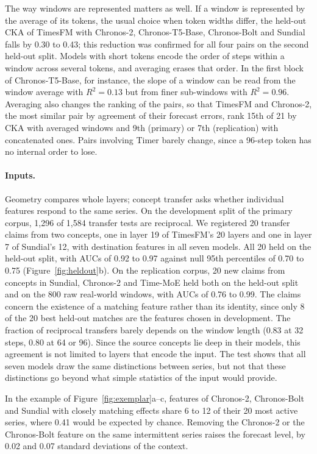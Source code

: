 \documentclass[twoside,11pt]{article}
\begin{document}
The way windows are represented matters as well. If a window is represented by the average of its tokens, the usual choice when token widths differ, the held-out CKA of TimesFM with Chronos-2, Chronos-T5-Base, Chronos-Bolt and Sundial falls by 0.30 to 0.43; this reduction was confirmed for all four pairs on the second held-out split.
Models with short tokens encode the order of steps within a window across several tokens, and averaging erases that order.
In the first block of Chronos-T5-Base, for instance, the slope of a window can be read from the window average with $R^2=0.13$ but from finer sub-windows with $R^2=0.96$.
Averaging also changes the ranking of the pairs, so that TimesFM and Chronos-2, the most similar pair by agreement of their forecast errors, rank 15th of 21 by CKA with averaged windows and 9th (primary) or 7th (replication) with concatenated ones.
Pairs involving Timer barely change, since a 96-step token has no internal order to lose.

\paragraph{Inputs.}
\label{sec:inputs}
Geometry compares whole layers; concept transfer asks whether individual features respond to the same series.
On the development split of the primary corpus, 1{,}296 of 1{,}584 transfer tests are reciprocal.
We registered 20 transfer claims from two concepts, one in layer 19 of TimesFM's 20 layers and one in layer 7 of Sundial's 12, with destination features in all seven models.
All 20 held on the held-out split, with AUCs of 0.92 to 0.97 against null 95th percentiles of 0.70 to 0.75 (Figure~\ref{fig:heldout}b).
On the replication corpus, 20 new claims from concepts in Sundial, Chronos-2 and Time-MoE held both on the held-out split and on the 800 raw real-world windows, with AUCs of 0.76 to 0.99.
The claims concern the existence of a matching feature rather than its identity, since only 8 of the 20 best held-out matches are the features chosen in development.
The fraction of reciprocal transfers barely depends on the window length (0.83 at 32 steps, 0.80 at 64 or 96).
Since the source concepts lie deep in their models, this agreement is not limited to layers that encode the input.
The test shows that all seven models draw the same distinctions between series, but not that these distinctions go beyond what simple statistics of the input would provide.

In the example of Figure~\ref{fig:exemplar}a--c, features of Chronos-2, Chronos-Bolt and Sundial with closely matching effects share 6 to 12 of their 20 most active series, where 0.41 would be expected by chance.
Removing the Chronos-2 or the Chronos-Bolt feature on the same intermittent series raises the forecast level, by 0.02 and 0.07 standard deviations of the context.
\end{document}
